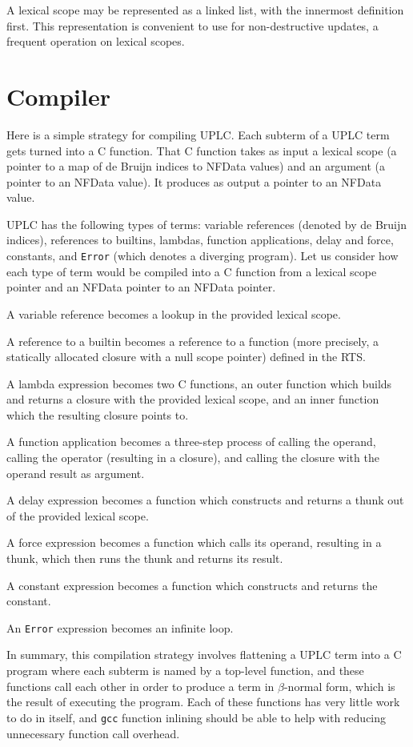 \documentclass[12pt]{article}
\begin{document}
A lexical scope may be represented as a linked list, with the innermost definition first. This representation is convenient to use for non-destructive updates, a frequent operation on lexical scopes.

\section{Compiler}

Here is a simple strategy for compiling UPLC. Each subterm of a UPLC term gets turned into a C function. That C function takes as input a lexical scope (a pointer to a map of de Bruijn indices to NFData values) and an argument (a pointer to an NFData value). It produces as output a pointer to an NFData value.

UPLC has the following types of terms: variable references (denoted by de Bruijn indices), references to builtins, lambdas, function applications, delay and force, constants, and \texttt{Error} (which denotes a diverging program). Let us consider how each type of term would be compiled into a C function from a lexical scope pointer and an NFData pointer to an NFData pointer.

A variable reference becomes a lookup in the provided lexical scope.

A reference to a builtin becomes a reference to a function (more precisely, a statically allocated closure with a null scope pointer) defined in the RTS.

A lambda expression becomes two C functions, an outer function which builds and returns a closure with the provided lexical scope, and an inner function which the resulting closure points to.

A function application becomes a three-step process of calling the operand, calling the operator (resulting in a closure), and calling the closure with the operand result as argument.

A delay expression becomes a function which constructs and returns a thunk out of the provided lexical scope.

A force expression becomes a function which calls its operand, resulting in a thunk, which then runs the thunk and returns its result.

A constant expression becomes a function which constructs and returns the constant.

An \texttt{Error} expression becomes an infinite loop.

In summary, this compilation strategy involves flattening a UPLC term into a C program where each subterm is named by a top-level function, and these functions call each other in order to produce a term in $\beta$-normal form, which is the result of executing the program. Each of these functions has very little work to do in itself, and \texttt{gcc} function inlining should be able to help with reducing unnecessary function call overhead.
\end{document}
